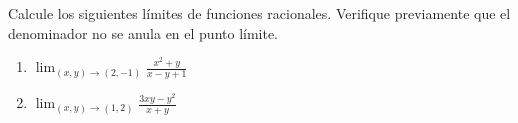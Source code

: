 Calcule los siguientes límites de funciones racionales. Verifique previamente que el denominador no se anula en el punto límite.
\begin{enumerate}
    \item $\displaystyle\lim_{(x,y) \to (2,-1)} \frac{x^2 + y}{x - y + 1}$
    \item $\displaystyle\lim_{(x,y) \to (1,2)} \frac{3xy - y^2}{x + y}$
\end{enumerate}
